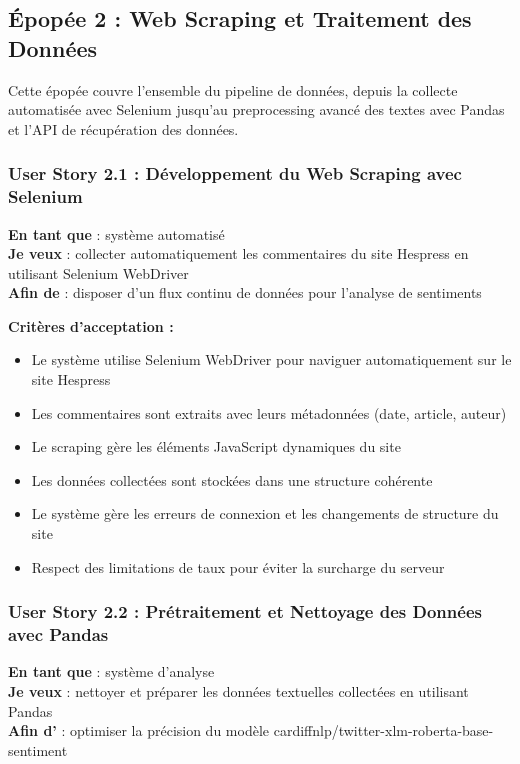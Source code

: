 \subsection{Épopée 2 : Web Scraping et Traitement des Données}

Cette épopée couvre l'ensemble du pipeline de données, depuis la collecte automatisée avec Selenium jusqu'au preprocessing avancé des textes avec Pandas et l'API de récupération des données.

\subsubsection{User Story 2.1 : Développement du Web Scraping avec Selenium}

\textbf{En tant que} : système automatisé \\
\textbf{Je veux} : collecter automatiquement les commentaires du site Hespress en utilisant Selenium WebDriver \\
\textbf{Afin de} : disposer d'un flux continu de données pour l'analyse de sentiments

\textbf{Critères d'acceptation :}
\begin{itemize}
    \item Le système utilise Selenium WebDriver pour naviguer automatiquement sur le site Hespress
    \item Les commentaires sont extraits avec leurs métadonnées (date, article, auteur)
    \item Le scraping gère les éléments JavaScript dynamiques du site
    \item Les données collectées sont stockées dans une structure cohérente
    \item Le système gère les erreurs de connexion et les changements de structure du site
    \item Respect des limitations de taux pour éviter la surcharge du serveur
\end{itemize}

\subsubsection{User Story 2.2 : Prétraitement et Nettoyage des Données avec Pandas}

\textbf{En tant que} : système d'analyse \\
\textbf{Je veux} : nettoyer et préparer les données textuelles collectées en utilisant Pandas \\
\textbf{Afin d'} : optimiser la précision du modèle cardiffnlp/twitter-xlm-roberta-base-sentiment

